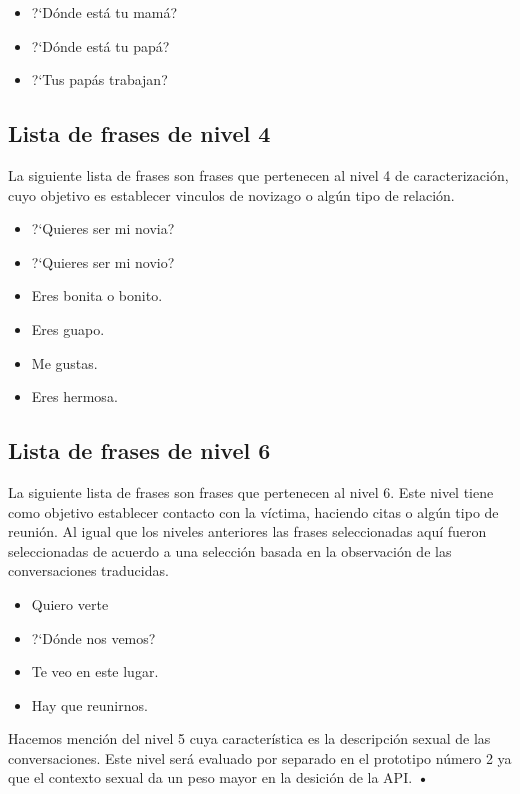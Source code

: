 \begin{itemize}
\item ?`D\'onde est\'a tu mam\'a?
\item ?`D\'onde est\'a tu pap\'a?
\item ?`Tus pap\'as trabajan?
\end{itemize}


\subsection{Lista de frases de nivel 4}
La siguiente lista de frases son frases que pertenecen al nivel 4 de caracterizaci\'on, cuyo objetivo es establecer vinculos de novizago o alg\'un tipo de relaci\'on. 


\begin{itemize}
\item ?`Quieres ser mi novia?
\item ?`Quieres ser mi novio?
\item Eres bonita o bonito.
\item Eres guapo.
\item Me gustas. 
\item Eres hermosa.
\end{itemize}

\subsection{Lista de frases de nivel 6}
La siguiente lista de frases son frases que pertenecen al nivel 6. Este nivel tiene como objetivo establecer contacto con la v\'ictima, haciendo citas o alg\'un tipo de reuni\'on. Al igual que los niveles anteriores las frases seleccionadas aqu\'i fueron seleccionadas de acuerdo a una selecci\'on basada en la observaci\'on de las conversaciones traducidas.


\begin{itemize}
\item Quiero verte
\item ?`D\'onde nos vemos?
\item Te veo en este lugar.
\item Hay que reunirnos.
\end{itemize}

Hacemos menci\'on del nivel 5 cuya caracter\'istica es la descripci\'on sexual de las conversaciones. Este nivel ser\'a evaluado por separado en el prototipo n\'umero 2 ya que el contexto sexual da un peso mayor en la desici\'on de la API.
\textbf{•}

